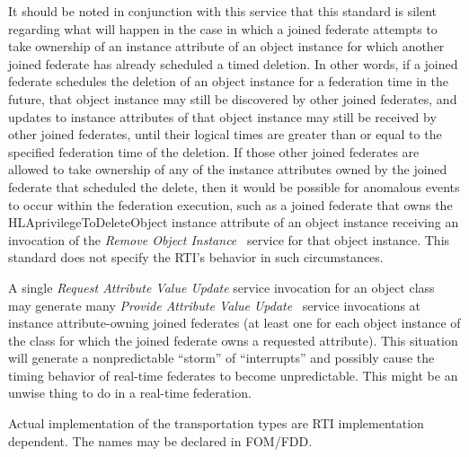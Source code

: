 \begin{annexstdpage}
    It should be noted in conjunction with this service that this standard is silent regarding what will happen in the case in which a joined federate attempts to take ownership of an instance attribute of an object instance for which another joined federate has already scheduled a timed deletion. In other words, if a joined federate schedules the deletion of an object instance for a federation time in the future, that object instance may still be discovered by other joined federates, and updates to instance attributes of that object instance may still be received by other joined federates, until their logical times are greater than or equal to the specified federation time of the deletion. If those other joined federates are allowed to take ownership of any of the instance attributes owned by the joined federate that scheduled the delete, then it would be possible for anomalous events to occur within the federation execution, such as a joined federate that owns the HLAprivilegeToDeleteObject instance attribute of an object instance receiving an invocation of the \textit{Remove Object Instance} \rtiinitiated\ service for that object instance. This standard does not specify the RTI's behavior in such circumstances.


    A single \textit{Request Attribute Value Update} service invocation for an object class may generate many \textit{Provide Attribute Value Update} \rtiinitiated\ service invocations at instance attribute-owning joined federates (at least one for each object instance of the class for which the joined federate owns a requested attribute). This situation will generate a nonpredictable ``storm'' of ``interrupts'' and possibly cause the timing behavior of real-time federates to become unpredictable. This might be an unwise thing to do in a real-time federation.


    Actual implementation of the transportation types are RTI implementation dependent. The names may be declared in FOM/FDD.
\end{annexstdpage}

\clearpage

